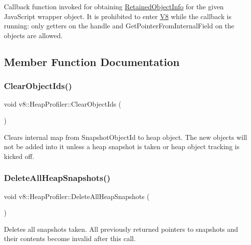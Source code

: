 Callback function invoked for obtaining \mbox{\hyperlink{classv8_1_1RetainedObjectInfo}{Retained\+Object\+Info}} for the given Java\+Script wrapper object. It is prohibited to enter \mbox{\hyperlink{classv8_1_1V8}{V8}} while the callback is running\+: only getters on the handle and Get\+Pointer\+From\+Internal\+Field on the objects are allowed. 

\subsection{Member Function Documentation}
\mbox{\label{classv8_1_1HeapProfiler_a8a90c630543ed1875cbf9166239ff8d3}} 
\subsubsection{\texorpdfstring{Clear\+Object\+Ids()}{ClearObjectIds()}}
{\footnotesize\ttfamily void v8\+::\+Heap\+Profiler\+::\+Clear\+Object\+Ids (\begin{DoxyParamCaption}{ }\end{DoxyParamCaption})}

Clears internal map from Snapshot\+Object\+Id to heap object. The new objects will not be added into it unless a heap snapshot is taken or heap object tracking is kicked off. \mbox{\label{classv8_1_1HeapProfiler_a6a75bcc6d8350858597b6a6ce5e349a2}} 
\subsubsection{\texorpdfstring{Delete\+All\+Heap\+Snapshots()}{DeleteAllHeapSnapshots()}}
{\footnotesize\ttfamily void v8\+::\+Heap\+Profiler\+::\+Delete\+All\+Heap\+Snapshots (\begin{DoxyParamCaption}{ }\end{DoxyParamCaption})}

Deletes all snapshots taken. All previously returned pointers to snapshots and their contents become invalid after this call. \mbox{\label{classv8_1_1HeapProfiler_ace729f9b7dbb2ca8b2fd67551bf5aae8}} 
